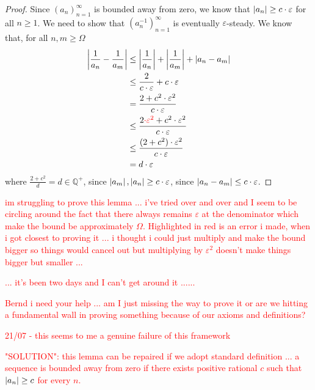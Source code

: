 { \label{lem:3}
\begin{proof}
    Since  $(a_n)_{n=1}^{\infty}$ is bounded away from zero, we know that $\left\lvert a_n \right\rvert \geq c \cdot \varepsilon$ for all $n \geq 1$. We need to show that $(a_n^{-1})_{n=1}^{\infty}$ is eventually $\varepsilon$-steady. We know that, for all $n,m \geq \Omega$
    \begin{align*}
        \left\lvert \frac{1}{a_n} - \frac{1}{a_m} \right\rvert & \leq \left\lvert \frac{1}{a_n} \right\rvert + \left\lvert \frac{1}{a_m} \right\rvert + \left\lvert a_n-a_m \right\rvert \\
        & \leq \frac{2}{c \cdot \varepsilon} + c \cdot \varepsilon \\
        & = \frac{2+c^2 \cdot \varepsilon^2}{c \cdot \varepsilon} \\
        & \leq \frac{2 \textcolor{red}{\cdot \varepsilon^2}+c^2 \cdot \varepsilon^2}{c \cdot \varepsilon} \\
        & \leq \frac{(2+c^2) \cdot \varepsilon^2}{c \cdot \varepsilon} \\
        & = d \cdot \varepsilon
    \end{align*}
    where $\frac{2+c^2}{d}=d \in \mathbb{Q}^+$, since $\left\lvert a_m \right\rvert, \left\lvert a_n \right\rvert \geq c \cdot \varepsilon$, since $\left\lvert a_n-a_m \right\rvert \leq c \cdot \varepsilon$. 
\end{proof}
\textcolor{red}{im struggling to prove this lemma ... i've tried over and over and I seem to be circling around the fact that there always remains $\varepsilon$ at the denominator which make the bound be approximately $\Omega$. Highlighted in red is an error i made, when i got closest to proving it ... i thought i could just multiply and make the bound bigger so things would cancel out but multiplying by $\varepsilon^2$ doesn't make things bigger but smaller ...}

\textcolor{red}{  ... it's been two days and I can't get around it ......}

\textcolor{red}{Bernd i need your help ... am I just missing the way to prove it or are we hitting a fundamental wall in proving something because of our axioms and definitions?}

\textcolor{red}{21/07 - this seems to me a genuine failure of this framework}

\textcolor{red}{"SOLUTION": this lemma can be repaired if we adopt standard definition ... a sequence is bounded away from zero if there exists positive rational $c$ such that $\left\lvert a_n \right\rvert\geq c$ for every $n$.}

}
